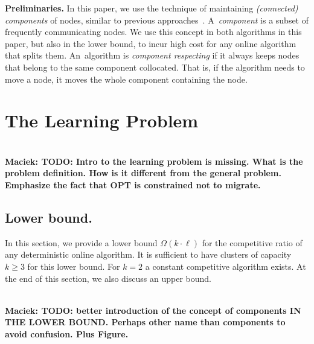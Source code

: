 \documentclass[manuscript,screen=true, review, anonymous]{acmart}
\newcommand\maciek[1]{\color{brown}\textbf{\\ Maciek: #1}\color{black}}
\begin{document}
\noindent \textbf{Preliminaries.}
In this paper, we use the technique of maintaining \emph{(connected) components} of nodes, similar to previous approaches~\cite{repartition-disc}. A~\emph{component} is a subset of frequently communicating nodes.
We use this concept in both algorithms in this paper, but also in the lower bound, to incur high cost for any online algorithm that splits them.
An~algorithm is \emph{component respecting}
if it always keeps nodes that  belong to the same component collocated.
That is,
if the algorithm needs to move a node,
it moves the whole component containing the node.



\section{The Learning Problem} %

\maciek{TODO: Intro to the learning problem is missing. What is the problem definition. How is it different from the general problem. Emphasize the fact that OPT is constrained not to migrate.}

\subsection{Lower bound.}

\label{sec:lowerbound}

In this section, we provide a lower bound $\Omega(k\cdot \ell)$ for the competitive ratio of any deterministic online algorithm.
It is sufficient to have clusters of capacity $k\geq 3$ for this lower bound.
For $k=2$ a constant competitive algorithm exists.
At the end of this section, we also
discuss an upper bound.

\maciek{TODO: better introduction of the concept of components IN THE LOWER BOUND. Perhaps other name than components to avoid confusion. Plus Figure.}
\end{document}
